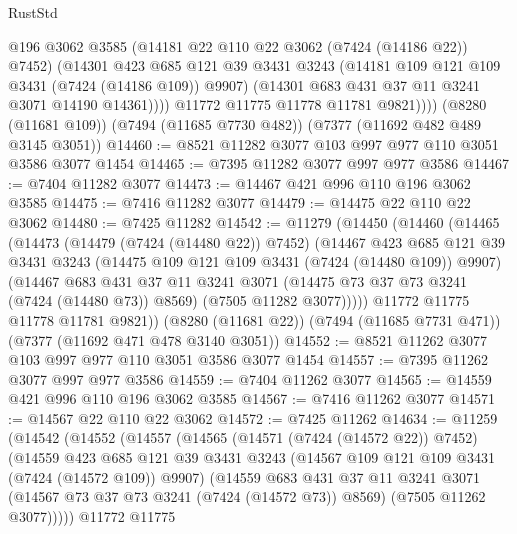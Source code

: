 \begin{lexlean}{RustStd}
\begin{coremodule}
{\begin{coremodule}
{{{{{{{{{{{{{{{{{{{{{{{{{{{{{{{{                @196
                @3062
                @3585
                (@14181 @22 @110 @22 @3062 (@7424 (@14186 @22)) @7452)
                (@14301
                  @423
                  @685
                  @121
                  @39
                  @3431
                  @3243
                  (@14181 @109 @121 @109 @3431 (@7424 (@14186 @109)) @9907)
                  (@14301 @683 @431 @37 @11 @3241 @3071 @14190 @14361))))
            @11772
            @11775
            @11778
            @11781
            @9821))))
    (@8280 (@11681 @109))
    (@7494 (@11685 @7730 @482))
    (@7377 (@11692 @482 @489 @3145 @3051))
@14460 := @8521 @11282 @3077 @103 @997 @977 @110 @3051 @3586 @3077 @1454
@14465 := @7395 @11282 @3077 @997 @977 @3586
@14467 := @7404 @11282 @3077
@14473 := @14467 @421 @996 @110 @196 @3062 @3585
@14475 := @7416 @11282 @3077
@14479 := @14475 @22 @110 @22 @3062
@14480 := @7425 @11282
@14542 := @11279
    (@14450
      (@14460
        (@14465
          (@14473
            (@14479 (@7424 (@14480 @22)) @7452)
            (@14467
              @423
              @685
              @121
              @39
              @3431
              @3243
              (@14475 @109 @121 @109 @3431 (@7424 (@14480 @109)) @9907)
              (@14467
                @683
                @431
                @37
                @11
                @3241
                @3071
                (@14475 @73 @37 @73 @3241 (@7424 (@14480 @73)) @8569)
                (@7505 @11282 @3077)))))
        @11772
        @11775
        @11778
        @11781
        @9821))
    (@8280 (@11681 @22))
    (@7494 (@11685 @7731 @471))
    (@7377 (@11692 @471 @478 @3140 @3051))
@14552 := @8521 @11262 @3077 @103 @997 @977 @110 @3051 @3586 @3077 @1454
@14557 := @7395 @11262 @3077 @997 @977 @3586
@14559 := @7404 @11262 @3077
@14565 := @14559 @421 @996 @110 @196 @3062 @3585
@14567 := @7416 @11262 @3077
@14571 := @14567 @22 @110 @22 @3062
@14572 := @7425 @11262
@14634 := @11259
    (@14542
      (@14552
        (@14557
          (@14565
            (@14571 (@7424 (@14572 @22)) @7452)
            (@14559
              @423
              @685
              @121
              @39
              @3431
              @3243
              (@14567 @109 @121 @109 @3431 (@7424 (@14572 @109)) @9907)
              (@14559
                @683
                @431
                @37
                @11
                @3241
                @3071
                (@14567 @73 @37 @73 @3241 (@7424 (@14572 @73)) @8569)
                (@7505 @11262 @3077)))))
        @11772
        @11775
}}}}}}}}}}}}}}}}}}}}}}}}}}}}}}}}
\end{coremodule}}
\end{coremodule}
\end{lexlean}
